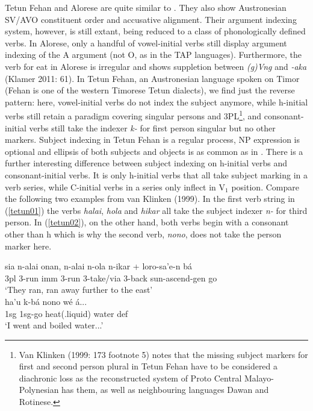 Tetun Fehan and Alorese are quite similar to . They also show Austronesian SV/AVO constituent order and accusative alignment. Their argument indexing system, however, is still extant, being reduced to a class of phonologically defined verbs. In Alorese, only a handful of vowel-initial verbs still display argument indexing of the A argument (not O, as in the TAP languages). Furthermore, the verb for eat in Alorese is irregular and shows suppletion between \textit{(g)Vng} and \textit{-aka} (Klamer 2011: 61). In Tetun Fehan, an Austronesian language spoken on Timor (Fehan is one of the western Timorese Tetun dialects), we find just the reverse pattern: here, vowel-initial verbs do not index the subject anymore, while h-initial verbs still retain a paradigm covering singular persons and 3PL\footnote{Van Klinken (1999: 173 footnote 5) notes that the missing subject markers for first and second person plural in Tetun Fehan have to be considered a diachronic loss as the reconstructed system of Proto Central Malayo-Polynesian has them, as well as neighbouring languages Dawan and Rotinese.}, and consonant-initial verbs still take the indexer \textit{k-} for first person singular but no other markers. Subject indexing in Tetun Fehan is a regular process, NP expression is optional and ellipsis of both subjects and objects is as common as in . There is a further interesting difference between subject indexing on h-initial verbs and consonant-initial verbs. It is only h-initial verbs that all take subject marking in a verb series, while C-initial verbs in a series only inflect in V$_1$ position. Compare the following two examples from van Klinken (1999). In the first verb string in (\ref{tetun01}) the verbs \textit{halai}, \textit{hola} and \textit{hikar} all take the subject indexer \textit{n-} for third person. In (\ref{tetun02}), on the other hand, both verbs begin with a consonant other than h which is why the second verb, \textit{nono}, does not take the person marker here.

\ea \label{tetun01}
\gll sia n-alai onan, n-alai n-ola n-ikar + loro-sa'e-n bá \\
\acs{3}\acs{pl} \acs{3}-run \acs{imm} \acs{3}-run \acs{3}-take/via \acs{3}-back sun-ascend-\acs{gen} go \\
\glft `They ran, ran away further to the east' \\ 
\endgl
\xe
\ea \label{tetun02}
\gll ha'u k-bá nono wé á... \\
\acs{1}\acs{sg} \acs{1}\acs{sg}-go heat(.liquid) water \acs{def} \\
\glft `I went and boiled water...' \\ 
\endgl
\xe


